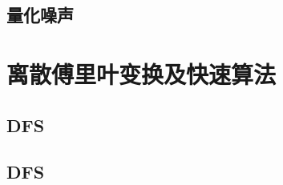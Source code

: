 \documentclass[en,11pt,english,black,simple,device=ppt]{elegantbook}
\begin{document}


\section{量化噪声}



\chapter{离散傅里叶变换及快速算法}

\section{DFS}



\section{DFS}


\end{document}
